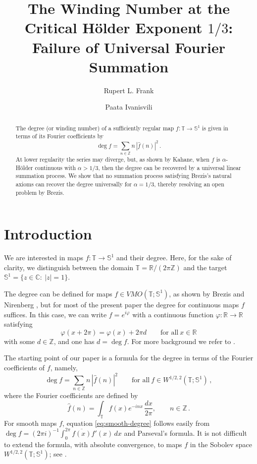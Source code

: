 \documentclass[11pt]{amsart}
\title[Winding number at the critical H\"older endpoint]
{The Winding Number at the Critical H\"older Exponent $1/3$:\\
Failure of Universal Fourier Summation}
\author{Rupert L. Frank}
\author{Paata Ivanisvili}
\date{\version}
\theoremstyle{definition}
\theoremstyle{remark}
\newcommand{\T}{\mathbb T}
\newcommand{\Sone}{\mathbb S^1}
\newcommand{\Z}{\mathbb Z}
\newcommand{\R}{\mathbb R}
\newcommand{\C}{\mathbb C}
\newcommand{\wh}{\widehat}
\DeclareMathOperator{\degmap}{deg}
\begin{document}
\begin{abstract}
The degree (or winding number) of a sufficiently regular map $f:\T\to\Sone$ is given in terms of its Fourier coefficients by
\[
 \degmap f=\sum_{n\in\Z}n\,|\wh f(n)|^2 \,.
\]
At lower regularity the series may diverge, but, as shown by Kahane, when $f$ is $\alpha$-H\"older continuous with $\alpha>1/3$, then the degree can be recovered by a universal linear summation process. We show that no summation process satisfying Brezis's natural axioms can recover the degree universally for $\alpha=1/3$, thereby resolving an open problem by Brezis.
\end{abstract}

\maketitle


\section{Introduction}

We are interested in maps $f:\T\to\Sone$ and their degree. Here, for the sake of clarity, we distinguish between the domain $\T=\R/(2\pi\Z)$ and the target $\Sone=\{ z\in\C:\ |z|=1\}$. 

The degree can be defined for maps $f\in VMO(\T;\Sone)$, as shown by Brezis and Nirenberg \cite{BrezisNirenberg1995}, but for most of the present paper the degree for continuous maps $f$ suffices. In this case, we can write $f=e^{i\varphi}$ with a continuous function $\varphi:\R\to\R$ satisfying
$$
\varphi(x+2\pi)=\varphi(x)+2\pi d
\qquad\text{for all}\ x\in\R
$$
with some $d\in\Z$, and one has $d=\deg f$. For more background we refer to \cite{Brezis2006,BrezisMironescu2021}.

The starting point of our paper is a formula for the degree in terms of the Fourier coefficients of $f$, namely,
\begin{equation}\label{eq:smooth-degree}
 \degmap f =\sum_{n\in\Z}n\,|\wh f(n)|^2 
 \qquad\text{for all}\ f\in W^{1/2,2}(\T;\Sone) \,,
\end{equation}
where the Fourier coefficients are defined by
$$
\wh f(n)=\int_\T f(x)e^{-inx}\,\frac{dx}{2\pi},\qquad n\in\Z \,.
$$
For smooth maps $f$, equation \eqref{eq:smooth-degree} follows easily from $\degmap f = (2\pi i)^{-1} \int_0^{2\pi} \overline{f(x)}f'(x)\,dx$ and Parseval's formula. It is not difficult to extend the formula, with absolute convergence, to maps $f$ in the Sobolev space $W^{1/2,2}(\T;\Sone)$; see \cite{Brezis1997}.
\end{document}
